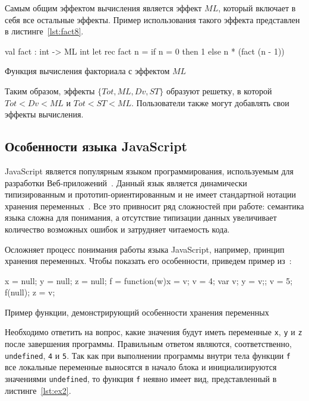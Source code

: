 Самым общим эффектом вычисления является эффект $ML$, который включает в себя все остальные эффекты. Пример использования такого эффекта представлен в листинге~\ref{lst:fact8}.

\begin{listing}[H]
\begin{pyglist}[language=ocaml,numbers=none,numbersep=5pt, fontsize=\small]
val fact : int -> ML int 
let rec fact n =
    if n = 0 then 1 else n * (fact (n - 1)) 
\end{pyglist}
\caption{Функция вычисления факториала с эффектом $ML$}
\label{lst:fact8} 
\end{listing}

Таким образом, эффекты $\{Tot, ML, Dv, ST\}$ образуют решетку, в которой $Tot < Dv < ML$ и  $Tot < ST < ML$. Пользователи также могут добавлять свои эффекты вычисления. 

\subsection{Особенности языка JavaScript}

JavaScript является популярным языком программирования, используемым для разработки Веб-приложений~\cite{top10}. Данный язык является динамически типизированным и прототип-ориентированным и не имеет стандартной нотации хранения переменных~\cite{js_semantics}. Все это привносит ряд сложностей при работе: семантика языка сложна для понимания, а отсутствие типизации данных увеличивает количество возможных ошибок и затрудняет читаемость кода.

Осложняет процесс понимания работы языка JavaScript, например, принцип хранения переменных. Чтобы показать его особенности, приведем пример из~\cite{js_semantics}: 

\begin{listing}
\begin{pyglist}[language=javascript,numbers=none,numbersep=5pt, fontsize=\small]
    x = null; y = null; z = null;
    f = function(w){x = v; v = 4; var v; y = v;};
    v = 5; f(null); z = v;
\end{pyglist}
\caption{Пример функции, демонстрирующий особенности хранения переменных}
\label{lst:ex1} 
\end{listing}

Необходимо ответить на вопрос, какие значения будут иметь переменные \verb|x|, \verb|y| и \verb|z| после завершения программы. Правильным ответом являются, соответственно, \verb|undefined|, \verb|4| и \verb|5|. Так как при выполнении программы внутри тела функции \verb|f| все локальные переменные выносятся в начало блока и инициализируются значениями \verb|undefined|, то функция \verb|f| неявно имеет вид, представленный в листинге~\ref{lst:ex2}.

